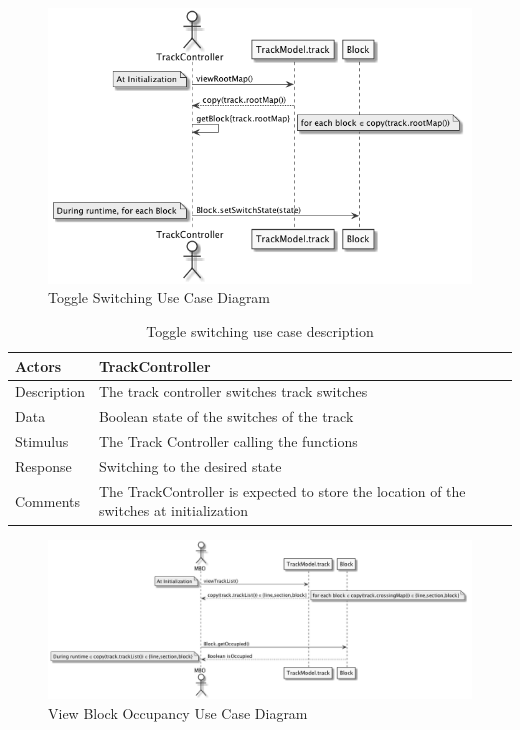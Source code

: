 \documentclass[]{article}
\begin{document}
\begin{figure}[H]
	\centering
	\includegraphics[scale=.5]{switching.png}
	\caption{Toggle Switching Use Case Diagram}
\end{figure}
\begin{table}[H]
	\centering
	\caption{Toggle switching use case description}
	\begin{tabular}{|l|l|}
		\hline
		Actors & \parbox[t]{10cm}{TrackController} \\ \hline
		Description & \parbox[t]{10cm}{The track controller switches track switches} \\ \hline
		Data &  \parbox[t]{10cm}{Boolean state of the switches of the track} \\ \hline
		Stimulus &  \parbox[t]{10cm}{The Track Controller calling the functions} \\ \hline
		Response & \parbox[t]{10cm}{Switching to the desired state}\\ \hline
		Comments & \parbox[t]{10cm}{The TrackController is expected to store the location of the switches at initialization}  \\ \hline
	\end{tabular}
\end{table}

\begin{figure}[H]
	\centering
	\includegraphics[scale=.5]{viewBlockOccupancy.png}
	\caption{View Block Occupancy Use Case Diagram}
\end{figure}
\end{document}
